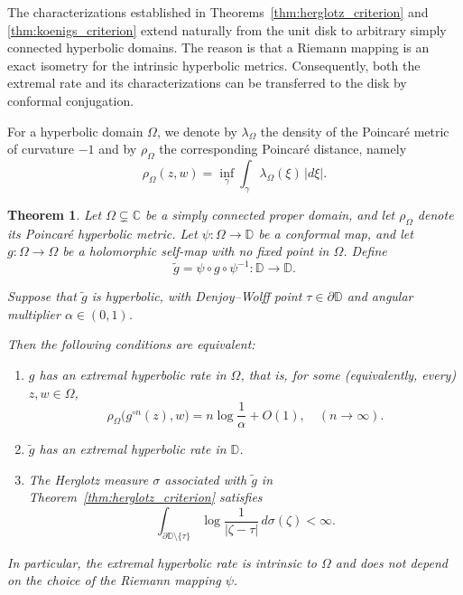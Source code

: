 \documentclass[12pt]{amsart}
\numberwithin{equation}{section}
\theoremstyle{plain}
\newtheorem{theorem}[equation]{Theorem}
\theoremstyle{definition}
\begin{document}
The characterizations established in
Theorems~\ref{thm:herglotz_criterion} and
\ref{thm:koenigs_criterion} extend naturally from the unit disk to
arbitrary simply connected hyperbolic domains. The reason is that a
Riemann mapping is an exact isometry for the intrinsic hyperbolic
metrics. Consequently, both the extremal rate and its characterizations
can be transferred to the disk by conformal conjugation.

For a hyperbolic domain $\Omega$, we denote by
$\lambda_\Omega$ the density of the Poincar\'e metric of curvature $-1$
and by $\rho_\Omega$ the corresponding Poincar\'e distance, namely
\begin{equation*}
\rho_\Omega(z,w)
=
\inf_\gamma\int_\gamma
\lambda_\Omega(\xi)\,|d\xi|.
\end{equation*}

\begin{theorem}
\label{thm:simply_connected}
Let $\Omega\subsetneq\mathbb C$ be a simply connected proper domain,
and let $\rho_\Omega$ denote its Poincar\'e hyperbolic metric. Let $\psi:\Omega\to\mathbb{D}$ be a conformal map, and let
$g:\Omega\to\Omega$ be a holomorphic self-map with no fixed point in
$\Omega$. Define
\begin{equation}\label{g tilde}
\widetilde g
=
\psi\circ g\circ\psi^{-1}:\mathbb{D}\to\mathbb{D}.
\end{equation}


Suppose that $\widetilde g$ is hyperbolic, with Denjoy--Wolff point
$\tau\in\partial\mathbb{D}$ and angular multiplier
$\alpha\in(0,1)$.

Then the following conditions are equivalent:
\begin{enumerate}
\item[\emph{(i)}]
$g$ has an extremal hyperbolic rate in $\Omega$, that is, for some
(equivalently, every) $z,w\in\Omega$,
\begin{equation*}
\label{eq:omega_extremal_rate}
\rho_\Omega\bigl(g^{\circ n}(z),w\bigr)
=
n\log\frac1\alpha+O(1),
\quad (n\to\infty).
\end{equation*}

\item[\emph{(ii)}]
$\widetilde g$ has an extremal hyperbolic rate in $\mathbb{D}$.

\item[\emph{(iii)}]
The Herglotz measure $\sigma$ associated with $\widetilde g$ in
Theorem~\ref{thm:herglotz_criterion} satisfies
\begin{equation*}
\label{eq:omega_extremal_condition}
\int_{\partial\mathbb{D}\setminus\{\tau\}}
\log\frac1{|\zeta-\tau|}
\,d\sigma(\zeta)
<\infty.
\end{equation*}
\end{enumerate}

In particular, the extremal hyperbolic rate is intrinsic to
$\Omega$ and does not depend on the choice of the Riemann mapping
$\psi$.
\end{theorem}
\end{document}
